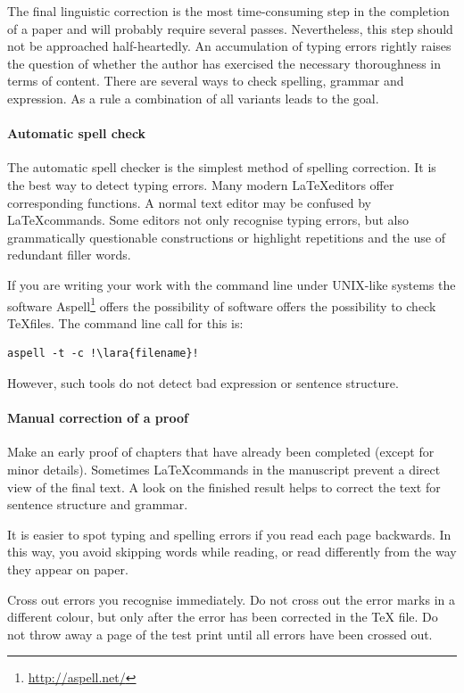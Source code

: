 The final linguistic correction is the most time-consuming step in the completion
of a paper and will probably require several passes.
Nevertheless, this step should not be approached half-heartedly.
An accumulation of typing errors rightly raises the question of whether the
author has exercised the necessary thoroughness in terms of content.
There are several ways to check spelling, grammar and expression. As a rule
a combination of all variants leads to the goal.


\paragraph{Automatic spell check}

The automatic spell checker is the simplest method of spelling correction.
It is the best way to detect typing errors.
Many modern \LaTeX editors offer corresponding functions. A normal text editor
may be confused by \LaTeX commands. Some editors not only recognise typing
errors, but also grammatically questionable constructions or highlight
repetitions and the use of redundant filler words.

If you are writing your work with the command line under UNIX-like systems
the software Aspell\footnote{\url{http://aspell.net/}} offers the possibility of
software offers the possibility to check \TeX files. The command line call for
this is:

\begin{lstlisting}[escapechar=\!]
 aspell -t -c !\lara{filename}!
\end{lstlisting}

However, such tools do not detect bad expression or sentence structure.


\paragraph{Manual correction of a proof}

Make an early proof of chapters that have already been completed (except for
minor details). Sometimes \LaTeX commands in the manuscript prevent a direct
view of the final text. A look on the finished result helps to correct the
text for sentence structure and grammar.

It is easier to spot typing and spelling errors if you read each page
backwards. In this way, you avoid skipping words while reading, or read
differently from the way they appear on paper.

Cross out errors you recognise immediately. Do not cross out the error marks
in a different colour, but only after the error has been corrected in the \TeX
file. Do not throw away a page of the test print until all errors have been
crossed out.


